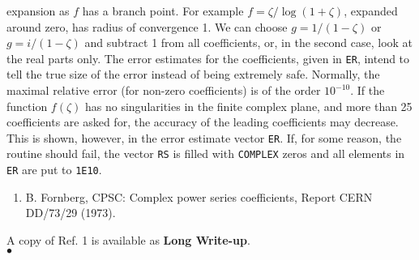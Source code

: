 expansion as $f$ has
a branch point. For example $f=\zeta/\log(1+\zeta)$, expanded
around zero, has radius of convergence 1. We can choose
$g=1/(1-\zeta)$ or $g=i/(1-\zeta)$ and subtract 1 from all coefficients,
or, in the second case, look at the real parts only.
\newpage
\Accuracy
The error estimates for the coefficients, given in {\tt ER}, intend
to tell the true size of the error instead of being extremely
safe. Normally, the maximal relative error (for non-zero
coefficients) is of the order $10^{-10}$. If the function $f(\zeta)$ has
no singularities in the finite complex plane, and more than 25
coefficients are asked for, the accuracy of the leading coefficients
may decrease. This is shown, however, in the error estimate vector
{\tt ER}. If, for some reason, the routine should fail, the vector
{\tt RS} is filled with {\tt COMPLEX} zeros and all elements in {\tt ER}
are put to {\tt 1E10}.
\Refer
\begin{enumerate}
\item B. Fornberg, CPSC: Complex power series coefficients,
Report CERN  DD/73/29 (1973).
\end{enumerate}
A copy of Ref. 1 is available as {\bf Long Write-up}.
\\ $\bullet$
